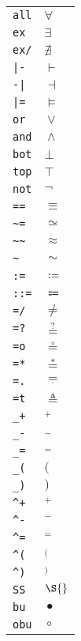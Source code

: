 \begin{longtable}{ll}
\texttt{all}&${}\forall {}$\\
\texttt{ex}&${}\exists {}$\\
\texttt{ex/}&${}\nexists {}$\\
\texttt{|{-}}&${}\vdash {}$\\
\texttt{{-}|}&${}\dashv {}$\\
\texttt{|=}&${}\models {}$\\
\texttt{or}&${}\vee {}$\\
\texttt{and}&${}\wedge {}$\\
\texttt{bot}&${}\bot {}$\\
\texttt{top}&${}\top {}$\\
\texttt{not}&${}\neg {}$\\
\texttt{==}&${}\equiv {}$\\
\texttt{\textasciitilde =}&${}\simeq {}$\\
\texttt{\textasciitilde \textasciitilde }&${}\approx {}$\\
\texttt{\textasciitilde }&${}\sim {}$\\
\texttt{:=}&${}\coloneqq {}$\\
\texttt{::=}&${}\Coloneqq {}$\\
\texttt{=/}&${}\neq {}$\\
\texttt{=?}&${}\mathrel{\overset{?}{=}} {}$\\
\texttt{=o}&${}\mathrel{\overset{\circ}{=}} {}$\\
\texttt{=*}&${}\mathrel{\overset{*}{=}} {}$\\
\texttt{=.}&${}\mathrel{\underset{\cdotp}{=}} {}$\\
\texttt{=t}&${}\triangleq {}$\\
\texttt{\_+}&${}_+ {}$\\
\texttt{\_{-}}&${}_- {}$\\
\texttt{\_=}&${}_= {}$\\
\texttt{\_(}&${}( {}$\\
\texttt{\_)}&${}) {}$\\
\texttt{\textasciicircum +}&${}^+ {}$\\
\texttt{\textasciicircum {-}}&${}^- {}$\\
\texttt{\textasciicircum =}&${}^= {}$\\
\texttt{\textasciicircum (}&${}^( {}$\\
\texttt{\textasciicircum )}&${}^) {}$\\
\texttt{SS}&${}\S {}$\\
\texttt{bu}&${}\bullet {}$\\
\texttt{obu}&${}\circ {}$\\

\end{longtable}
